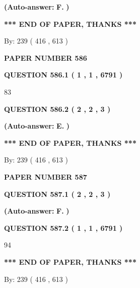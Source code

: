 \documentclass{ctexart}
\begin{document}
 
{\textbf{(Auto-answer:}}
{\textbf{\large{
F.}}}
{\textbf{)}}
 
 
   
   
   
   
\vspace{1.0in} 
{\textbf{\large{ *** END OF PAPER, THANKS *** }}} 
   
   
\hspace{1.0in} By: 
 239 ( 416 ,  613 )
   
   
   
   
\newpage 
\setcounter{page}{ 
   586001 } 
   
   
 {\textbf{ \Large{ PAPER NUMBER  586  }}}
   
   
   
   
  
  
{\textbf{\large{QUESTION
586.1 
 ( 1 , 1 , 6791 )
}}}

83
  
  
{\textbf{\large{QUESTION
586.2 
 ( 2 , 2 , 3 )
}}}
 
 
{\textbf{(Auto-answer:}}
{\textbf{\large{
E.}}}
{\textbf{)}}
 
 
   
   
   
   
\vspace{1.0in} 
{\textbf{\large{ *** END OF PAPER, THANKS *** }}} 
   
   
\hspace{1.0in} By: 
 239 ( 416 ,  613 )
   
   
   
   
\newpage 
\setcounter{page}{ 
   587001 } 
   
   
 {\textbf{ \Large{ PAPER NUMBER  587  }}}
   
   
   
   
  
  
{\textbf{\large{QUESTION
587.1 
 ( 2 , 2 , 3 )
}}}
 
 
{\textbf{(Auto-answer:}}
{\textbf{\large{
F.}}}
{\textbf{)}}
 
 
  
  
{\textbf{\large{QUESTION
587.2 
 ( 1 , 1 , 6791 )
}}}

94
   
   
   
   
\vspace{1.0in} 
{\textbf{\large{ *** END OF PAPER, THANKS *** }}} 
   
   
\hspace{1.0in} By: 
 239 ( 416 ,  613 )
   
   
   
\end{document}
